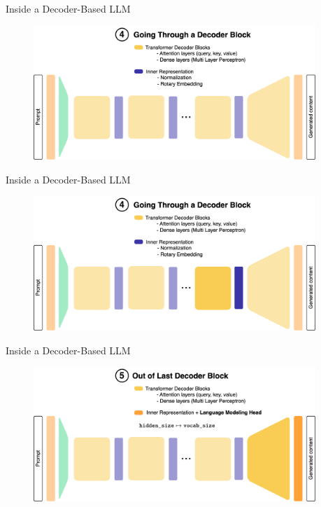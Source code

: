 \documentclass[11pt,aspectratio=169]{beamer}
\begin{document}
\begin{frame}{Inside a Decoder-Based LLM}
    \begin{figure}
        \centering
        \includegraphics[width=0.95\textwidth]{llm_6.png}
    \end{figure}
\end{frame}

\begin{frame}{Inside a Decoder-Based LLM}
    \begin{figure}
        \centering
        \includegraphics[width=0.95\textwidth]{llm_7.png}
    \end{figure}
\end{frame}

\begin{frame}{Inside a Decoder-Based LLM}
    \begin{figure}
        \centering
        \includegraphics[width=0.95\textwidth]{llm_8.png}
    \end{figure}
\end{frame}
\end{document}
